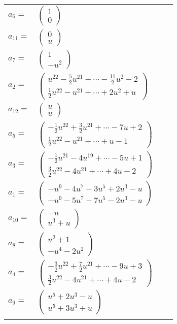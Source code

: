 \documentclass[1p]{elsarticle_modified}
\theoremstyle{definition}
\begin{document}
\begin{tabular}{m{7pt} m{180pt} m{7pt} m{180pt} }
\flushright $a_{6}=$&$\begin{pmatrix}1\\0\end{pmatrix}$ \\
\flushright $a_{11}=$&$\begin{pmatrix}0\\u\end{pmatrix}$ \\
\flushright $a_{7}=$&$\begin{pmatrix}1\\- u^2\end{pmatrix}$ \\
\flushright $a_{2}=$&$\begin{pmatrix}u^{22}-\frac{5}{2} u^{21}+\cdots-\frac{11}{2} u^2-2\\\frac{1}{2} u^{22}- u^{21}+\cdots+2 u^2+u\end{pmatrix}$ \\
\flushright $a_{12}=$&$\begin{pmatrix}u\\u\end{pmatrix}$ \\
\flushright $a_{5}=$&$\begin{pmatrix}-\frac{1}{2} u^{22}+\frac{3}{2} u^{21}+\cdots-7 u+2\\\frac{1}{2} u^{22}- u^{21}+\cdots+u-1\end{pmatrix}$ \\
\flushright $a_{3}=$&$\begin{pmatrix}-\frac{1}{2} u^{21}-4 u^{19}+\cdots-5 u+1\\\frac{3}{2} u^{22}-4 u^{21}+\cdots+4 u-2\end{pmatrix}$ \\
\flushright $a_{1}=$&$\begin{pmatrix}- u^9-4 u^7-3 u^5+2 u^3- u\\- u^9-5 u^7-7 u^5-2 u^3- u\end{pmatrix}$ \\
\flushright $a_{10}=$&$\begin{pmatrix}- u\\u^3+u\end{pmatrix}$ \\
\flushright $a_{8}=$&$\begin{pmatrix}u^2+1\\- u^4-2 u^2\end{pmatrix}$ \\
\flushright $a_{4}=$&$\begin{pmatrix}-\frac{3}{2} u^{22}+\frac{7}{2} u^{21}+\cdots-9 u+3\\\frac{3}{2} u^{22}-4 u^{21}+\cdots+4 u-2\end{pmatrix}$ \\
\flushright $a_{9}=$&$\begin{pmatrix}u^5+2 u^3- u\\u^5+3 u^3+u\end{pmatrix}$\\&\end{tabular}
\end{document}
